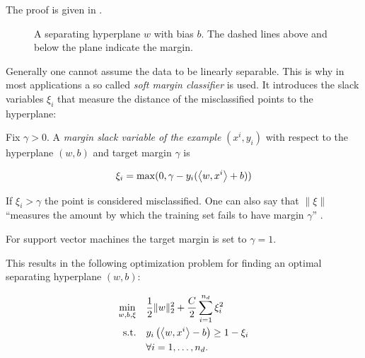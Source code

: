 The proof is given in \cite[chapter 6.1]{Cristianini2000}. 

\begin{figure}[ht]%
	\center
\caption[Separating hyperplane]{A separating hyperplane \(w\) with bias \(b\). The dashed lines above and below the plane indicate the margin.}%
\label{fig_hyperplane}%
\end{figure}

Generally one cannot assume the data to be linearly separable. This is why in most applications a so called \emph{soft margin classifier} is used. It introduces the slack variables \(\xi_i\) that measure the distance of the misclassified points to the hyperplane:


Fix \(\gamma > 0\). A \emph{margin slack variable of the example} \((x^i,y_i)\) with respect to the hyperplane \((w,b)\) and target margin \(\gamma\) is 

\[\xi_i = \max(0, \gamma - y_i(\left\langle w,x^i\right\rangle+b))\] 

If \(\xi_i > \gamma\) the point is considered misclassified. 
One can also say that \(\|\xi\|\) ``measures the amount by which the training set fails to have margin \(\gamma\)'' \cite[section 2.1.1]{Cristianini2000}.

For support vector machines the target margin is set to \(\gamma = 1\).


This results in the following optimization problem for finding an optimal separating hyperplane \((w,b)\): 


%
\begin{align}
\begin{split}
	\min_{w,b,\xi} \quad & \frac{1}{2} \|w\|^2_2+\frac{C}{2}\sum_{i=1}^{n_d}{\xi_i^2} \vspace{0.5ex}\\
	\text{s.t.} \quad & y_i\left(\Langle w,x^i\Rangle-b\right) \geq 1 - \xi_i \vspace{0.5ex}\\
	& 	\forall i = 1, \dots , n_d.
\end{split}
\label{SVM_2}
\end{align}

